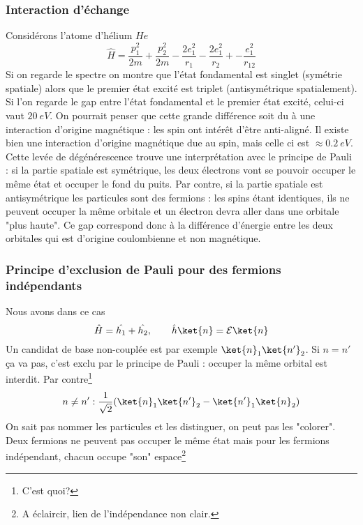 \subsubsection{Interaction d'échange}
Considérons l'atome d'hélium $He$
\begin{equation}
\hat{H} = \frac{p_1^2}{2m}+\frac{p^2_2}{2m} - \frac{2e_1^2}{r_1}- \frac{2e_1^2}{r_2}+- \frac{e_1^2}{r_{12}}
\end{equation}
Si on regarde le spectre on montre que l'état fondamental est singlet (symétrie spatiale) alors que le premier état excité est triplet (antisymétrique spatialement).\\

Si l'on regarde le gap entre l'état fondamental et le premier état excité, celui-ci vaut $20\ eV$. On pourrait penser 
que cette grande différence soit du à une interaction d'origine magnétique : les spin ont intérêt d'être anti-aligné. 
Il existe bien une interaction d'origine magnétique due au spin, mais celle ci est $\approx 0.2\ eV$. Cette levée de 
dégénérescence trouve une interprétation avec le principe de Pauli : si la partie spatiale est symétrique, les deux 
électrons vont se pouvoir occuper le même état et occuper le fond du puits. Par contre, si la partie spatiale est 
antisymétrique les particules sont des fermions : les spins étant identiques, ils ne peuvent occuper la même orbitale 
et un électron devra aller dans une orbitale "plus haute". Ce gap correspond donc à la différence d'énergie entre les 
deux orbitales qui est d'origine coulombienne et non magnétique.

\subsubsection{Principe d'exclusion de Pauli pour des fermions indépendants}
Nous avons dans ce cas
\begin{equation}
\hat{H} = \hat{h_1}+\hat{h_2},\qquad \hat{h}\ket{n} = \mathcal{E}\ket{n}
\end{equation}
Un candidat de base non-couplée est par exemple $\ket{n}_1\ket{n'}_2$. Si $n=n'$ ça va pas, c'est exclu par le 
principe de Pauli : occuper la même orbital est interdit. Par contre\footnote{C'est quoi?}
\begin{equation}
n\neq n' : \frac{1}{\sqrt{2}}(\ket{n}_1\ket{n'}_2-\ket{n'}_1\ket{n}_2)
\end{equation}
On sait pas nommer les particules et les distinguer, on peut pas les "colorer". Deux fermions ne peuvent pas occuper le 
même état mais pour les fermions indépendant, chacun occupe "son" espace\footnote{A éclaircir, lien de l'indépendance non clair.} 


